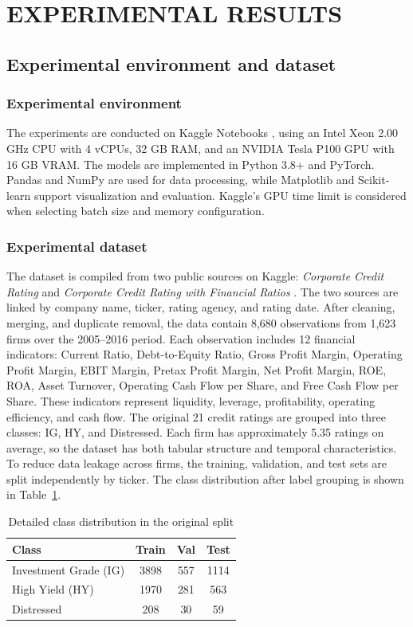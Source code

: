 \documentclass[10pt,twoside]{article}
\begin{document}
\section{EXPERIMENTAL RESULTS}

\subsection{Experimental environment and dataset}

\subsubsection{Experimental environment}
The experiments are conducted on Kaggle Notebooks \cite{noauthor_notebooks_nodate}, using an Intel Xeon 2.00 GHz CPU with 4 vCPUs, 32 GB RAM, and an NVIDIA Tesla P100 GPU with 16 GB VRAM. The models are implemented in Python 3.8+ and PyTorch. Pandas and NumPy are used for data processing, while Matplotlib and Scikit-learn support visualization and evaluation. Kaggle's GPU time limit is considered when selecting batch size and memory configuration.

\subsubsection{Experimental dataset}
The dataset is compiled from two public sources on Kaggle: \textit{Corporate Credit Rating} \cite{noauthor_corporate_credit_rating_nodate} and \textit{Corporate Credit Rating with Financial Ratios} \cite{noauthor_corporate_financial_ratios_nodate}. The two sources are linked by company name, ticker, rating agency, and rating date. After cleaning, merging, and duplicate removal, the data contain 8,680 observations from 1,623 firms over the 2005--2016 period. Each observation includes 12 financial indicators: Current Ratio, Debt-to-Equity Ratio, Gross Profit Margin, Operating Profit Margin, EBIT Margin, Pretax Profit Margin, Net Profit Margin, ROE, ROA, Asset Turnover, Operating Cash Flow per Share, and Free Cash Flow per Share. These indicators represent liquidity, leverage, profitability, operating efficiency, and cash flow. The original 21 credit ratings are grouped into three classes: IG, HY, and Distressed. Each firm has approximately 5.35 ratings on average, so the dataset has both tabular structure and temporal characteristics. To reduce data leakage across firms, the training, validation, and test sets are split independently by ticker. The class distribution after label grouping is shown in Table~\ref{tab:class_distribution}.
\begin{table}[H] 
\centering 
\caption{Detailed class distribution in the original split} 
\label{tab:class_distribution} 
\begin{tabular}{lccc} 
\hline \textbf{Class} & \textbf{Train} & \textbf{Val} & \textbf{Test} \\ \hline Investment Grade (IG) & 3898 & 557 & 1114 \\ High Yield (HY) & 1970 & 281 & 563 \\ Distressed & 208 & 30 & 59 \\ \hline 
\end{tabular} 
\end{table}
\end{document}
